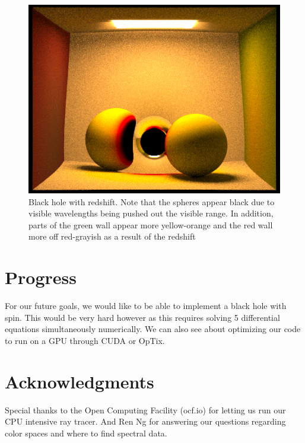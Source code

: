 \documentclass[sigconf]{acmart}
\begin{document}
\begin{figure}[h]
  \centering
  \includegraphics[width=\linewidth]{CBspheres_lambertian_screenshot_4-28_20-52-32.png}
  \caption{Black hole with redshift.  Note that the spheres appear black due to visible wavelengths being pushed out the visible range.  In addition, parts of the green wall appear more yellow-orange and the red wall more off red-grayish as a result of the redshift}
  \Description{}
\end{figure}

\section{Progress}

For our future goals, we would like to be able to implement a black hole with spin.  This would be very hard however as this requires solving 5 differential equations simultaneously numerically.  We can also see about optimizing our code to run on a GPU through CUDA or OpTix.

\section{Acknowledgments}

Special thanks to the Open Computing Facility (ocf.io) for letting us run our CPU intensive ray tracer. And Ren Ng for answering our questions regarding color spaces and where to find spectral data.



\end{document}
